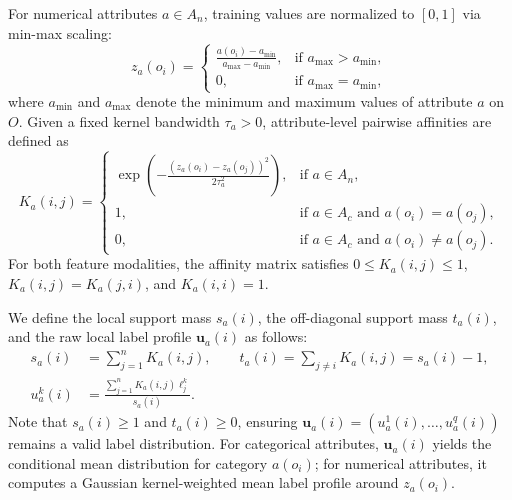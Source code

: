 For numerical attributes $a \in A_n$, training values are normalized to $[0, 1]$ via min-max scaling:
\begin{equation}
	z_a(o_i) = \begin{cases}
		\displaystyle\frac{a(o_i) - a_{\min}}{a_{\max} - a_{\min}}, & \text{if } a_{\max} > a_{\min}, \\[6pt]
		0, & \text{if } a_{\max} = a_{\min},
	\end{cases}
	\label{eq:numerical-normalization}
\end{equation}
where $a_{\min}$ and $a_{\max}$ denote the minimum and maximum values of attribute $a$ on $O$. Given a fixed kernel bandwidth $\tau_a > 0$, attribute-level pairwise affinities are defined as
\begin{equation}
	K_a(i,j) = \begin{cases}
		\displaystyle\exp\left( -\frac{(z_a(o_i) - z_a(o_j))^2}{2\tau_a^2} \right), & \text{if } a \in A_n, \\[8pt]
		1, & \text{if } a \in A_c \text{ and } a(o_i) = a(o_j), \\
		0, & \text{if } a \in A_c \text{ and } a(o_i) \neq a(o_j).
	\end{cases}
	\label{eq:attribute-affinity}
\end{equation}
For both feature modalities, the affinity matrix satisfies $0 \le K_a(i,j) \le 1$, $K_a(i,j) = K_a(j,i)$, and $K_a(i,i) = 1$.

We define the local support mass $s_a(i)$, the off-diagonal support mass $t_a(i)$, and the raw local label profile $\boldsymbol{u}_a(i)$ as follows:
\begin{align}
	s_a(i) &= \sum_{j=1}^n K_a(i,j), \qquad t_a(i) = \sum_{j \neq i} K_a(i,j) = s_a(i) - 1, \label{eq:local-support} \\
	u_a^k(i) &= \frac{\sum_{j=1}^n K_a(i,j) \ell_j^k}{s_a(i)}. \label{eq:raw-local-profile}
\end{align}
Note that $s_a(i) \ge 1$ and $t_a(i) \ge 0$, ensuring $\boldsymbol{u}_a(i) = (u_a^1(i), \dots, u_a^q(i))$ remains a valid label distribution. For categorical attributes, $\boldsymbol{u}_a(i)$ yields the conditional mean distribution for category $a(o_i)$; for numerical attributes, it computes a Gaussian kernel-weighted mean label profile around $z_a(o_i)$.

